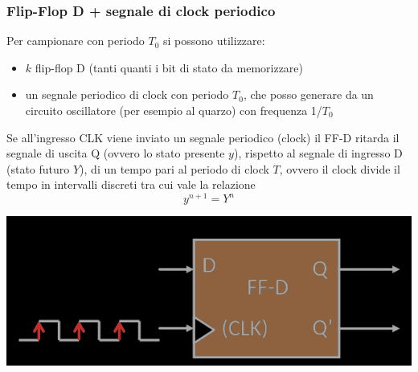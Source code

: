 \documentclass{article}
\begin{document}
\subsubsection{Flip-Flop D + segnale di clock periodico}
Per campionare con periodo $T_0$ si possono utilizzare:
\begin{itemize}
    \item $k$ flip-flop D (tanti quanti i bit di stato da memorizzare)
    \item un segnale periodico di clock con periodo $T_0$, che posso generare da un circuito oscillatore (per esempio al quarzo) con frequenza 1/$T_0$
\end{itemize}
Se all’ingresso CLK viene inviato un segnale periodico (clock) il FF-D ritarda il segnale di uscita Q (ovvero lo stato presente $y$), rispetto al segnale di ingresso D (stato futuro $Y$), di un tempo pari al periodo di clock $T$, ovvero il clock divide il tempo in intervalli discreti tra cui vale la relazione
$$ y^{n+1} = Y^n $$
\begin{center}
    \includegraphics[scale=0.35]{signale periodico CLK.png}
\end{center}
\end{document}
